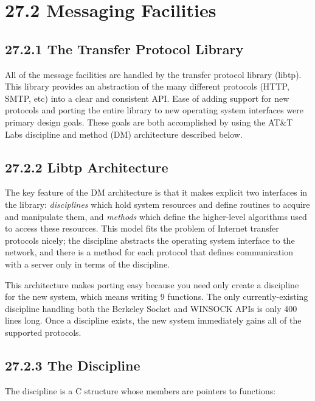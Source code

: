 \section[27.2 Messaging Facilities]{27.2 Messaging Facilities}
\subsection[27.2.1 The Transfer Protocol Library]{27.2.1 The Transfer
Protocol Library}

All of the message facilities are handled by the transfer protocol
library (libtp). This library provides an abstraction of the many
different protocols (HTTP, SMTP, etc) into a clear and consistent
API. Ease of adding support for new protocols and porting the entire
library to new operating system interfaces were primary design
goals. These goals are both accomplished by using the AT\&T Labs
discipline and method (DM) architecture described below.

\subsection[27.2.2 Libtp Architecture]{27.2.2 Libtp Architecture}

The key feature of the DM architecture is that it makes explicit two
interfaces in the library: \textit{disciplines} which hold system
resources and define routines to acquire and manipulate them, and
\textit{methods} which define the higher-level algorithms used to
access these resources. This model fits the problem of Internet
transfer protocols nicely; the discipline abstracts the operating
system interface to the network, and there is a method for each
protocol that defines communication with a server only in terms of the
discipline.

This architecture makes porting easy because you need only create a
discipline for the new system, which means writing 9 functions. The
only currently-existing discipline handling both the Berkeley Socket
and WINSOCK APIs is only 400 lines long. Once a discipline exists, the
new system immediately gains all of the supported protocols.

\subsection[27.2.3 The Discipline]{27.2.3 The Discipline}

The discipline is a C structure whose members are pointers to functions:

